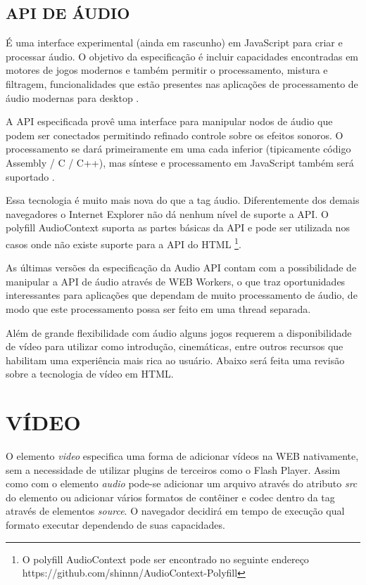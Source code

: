 \subsection{API DE ÁUDIO}

É uma interface experimental (ainda em rascunho) em JavaScript para
criar e processar áudio. O objetivo da especificação é incluir
capacidades encontradas em motores de jogos modernos e também permitir
o processamento, mistura e filtragem, funcionalidades que estão
presentes nas aplicações de processamento de áudio modernas para
desktop \autocite{audioApiSpec}.

A API especificada provê uma interface para manipular nodos de
áudio que podem ser conectados permitindo refinado controle sobre os
efeitos sonoros. O processamento se dará primeiramente em uma cada
inferior (tipicamente código Assembly / C / C++), mas síntese e
processamento em JavaScript também será suportado \autocite{audioApiSpec}.

Essa tecnologia é muito mais nova do que a tag áudio. Diferentemente
dos demais navegadores o Internet Explorer não dá nenhum
nível de suporte a API. O polyfill AudioContext suporta as partes
básicas da API e pode ser utilizada nos casos onde não existe suporte
para a API do HTML \footnote{O polyfill AudioContext pode ser encontrado no seguinte endereço https://github.com/shinnn/AudioContext-Polyfill}.

As últimas versões da especificação da Audio API contam com a
possibilidade de manipular a API de áudio através de WEB Workers, o
que traz oportunidades interessantes para aplicações que dependam de
muito processamento de áudio, de modo que este processamento possa ser
feito em uma thread separada.

Além de grande flexibilidade com áudio alguns jogos requerem a
disponibilidade de vídeo para utilizar como introdução, cinemáticas,
entre outros recursos que habilitam uma experiência mais rica ao
usuário. Abaixo será feita uma revisão sobre a tecnologia de vídeo
em HTML.
\section{VÍDEO}

O elemento \textit{video} especifica uma forma de adicionar vídeos na
WEB nativamente, sem a necessidade de utilizar plugins de terceiros
como o Flash Player. Assim como com o elemento \textit{audio} pode-se
adicionar um arquivo através do atributo \textit{src} do elemento
ou adicionar vários formatos de contêiner e codec dentro da tag
através de elementos \textit{source}. O navegador decidirá em tempo de
execução qual formato executar dependendo de suas capacidades.

